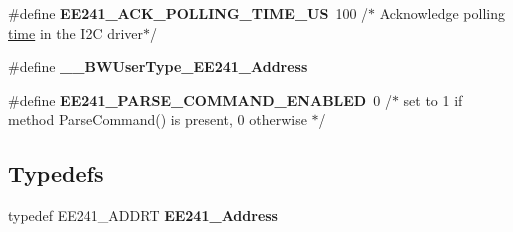 \begin{DoxyCompactItemize}
\item 
\hypertarget{group___e_e241__module_ga96d41497b8dcd85d78124484ef837fb7}{\#define {\bfseries E\-E241\-\_\-\-A\-C\-K\-\_\-\-P\-O\-L\-L\-I\-N\-G\-\_\-\-T\-I\-M\-E\-\_\-\-U\-S}~100 /$\ast$ Acknowledge polling \hyperlink{group__main__module_ga18fd04fdadfae991704e8d58a0e0ae8e}{time} in the I2\-C driver$\ast$/}\label{group___e_e241__module_ga96d41497b8dcd85d78124484ef837fb7}

\item 
\hypertarget{group___e_e241__module_gab2bd16709a938e5cf3e4d10517a86d89}{\#define {\bfseries \-\_\-\-\_\-\-B\-W\-User\-Type\-\_\-\-E\-E241\-\_\-\-Address}}\label{group___e_e241__module_gab2bd16709a938e5cf3e4d10517a86d89}

\item 
\hypertarget{group___e_e241__module_ga265be1273aa290e3ab124bb62451a402}{\#define {\bfseries E\-E241\-\_\-\-P\-A\-R\-S\-E\-\_\-\-C\-O\-M\-M\-A\-N\-D\-\_\-\-E\-N\-A\-B\-L\-E\-D}~0 /$\ast$ set to 1 if method Parse\-Command() is present, 0 otherwise $\ast$/}\label{group___e_e241__module_ga265be1273aa290e3ab124bb62451a402}

\end{DoxyCompactItemize}
\subsection*{Typedefs}
\begin{DoxyCompactItemize}
\item 
\hypertarget{group___e_e241__module_gaf4970fb35e701ca12079b313406849fd}{typedef E\-E241\-\_\-\-A\-D\-D\-R\-T {\bfseries E\-E241\-\_\-\-Address}}\label{group___e_e241__module_gaf4970fb35e701ca12079b313406849fd}

\end{DoxyCompactItemize}
